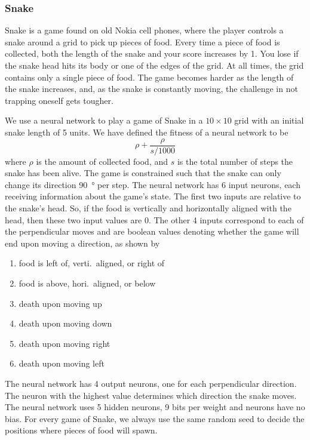 \subsubsection{Snake}
Snake is a game found on old Nokia cell phones, where the player controls a snake around a grid to pick up pieces of food.
Every time a piece of food is collected, both the length of the snake and your score increases by 1.
You lose if the snake head hits its body or one of the edges of the grid.
At all times, the grid contains only a single piece of food.
The game becomes harder as the length of the snake increases, and, as the snake is constantly moving, the challenge in not trapping oneself gets tougher.

We use a neural network to play a game of Snake in a $10 \times 10$ grid with an initial snake length of 5 units.
We have defined the fitness of a neural network to be 
\[
  \rho + \frac{\rho}{s/1000}
\]
where $\rho$ is the amount of collected food, and $s$ is the total number of steps the snake has been alive. The game is constrained such that the snake can only change its direction \SI{90}{\degree} per step. The neural network has 6 input neurons, each receiving information about the game's state. The first two inputs are relative to the snake's head. So, if the food is vertically and horizontally aligned with the head, then these two input values are 0. The other 4 inputs correspond to each of the perpendicular moves and are boolean values denoting whether the game will end upon moving a direction, as shown by
\begin{enumerate}
  \item {} food is left of, verti.\ aligned, or right of
  \item {} food is above, hori.\ aligned, or below
  \item {} death upon moving up 
  \item {} death upon moving down 
  \item {} death upon moving right
  \item {} death upon moving left 
\end{enumerate}
The neural network has 4 output neurons, one for each perpendicular direction. The neuron with the highest value determines which direction the snake moves.
The neural network uses 5 hidden neurons, 9 bits per weight and neurons have no bias.
For every game of Snake, we always use the same random seed to decide the positions where pieces of food will spawn.
